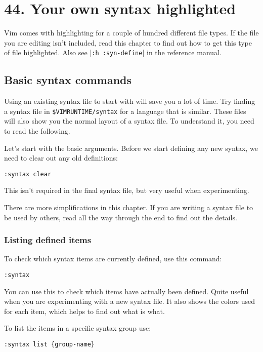 \section{44. Your own syntax highlighted}
\label{Your own syntax highlighted}
Vim comes with highlighting for a couple of hundred different file types.
If the file you are editing isn't included, read this chapter to find out how to get this type of file highlighted.
Also see |\texttt{:h :syn-define}| in the reference manual.
\subsection{Basic syntax commands}
Using an existing syntax file to start with will save you a lot of time.
Try finding a syntax file in \texttt{\$VIMRUNTIME/syntax} for a language that is similar.
These files will also show you the normal layout of a syntax file.
To understand it, you need to read the following.

Let's start with the basic arguments.
Before we start defining any new syntax, we need to clear out any old definitions:

\begin{Verbatim}[samepage=true]
 :syntax clear
\end{Verbatim}

This isn't required in the final syntax file, but very useful when experimenting.

There are more simplifications in this chapter.
If you are writing a syntax file to be used by others, read all the way through the end to find out the details.

\subsubsection{Listing defined items}
To check which syntax items are currently defined, use this command:

\begin{Verbatim}[samepage=true]
 :syntax
\end{Verbatim}

You can use this to check which items have actually been defined.
Quite useful when you are experimenting with a new syntax file.
It also shows the colors used for each item, which helps to find out what is what.

To list the items in a specific syntax group use:

\begin{Verbatim}[samepage=true]
 :syntax list {group-name}
\end{Verbatim}

